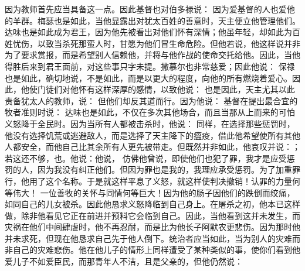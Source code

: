 因为教师首先应当具备这一点。因此基督也对伯多禄说： 因为爱基督的人也爱他的羊群。梅瑟也是如此，当他显露出对犹太百姓的善意时，天主便立他管理他们。达味也是如此成为君王，因为他先被看出对他们怀有深情；他虽年轻，却如此为百姓忧伤，以致当杀死那蛮人时，甘愿为他们冒生命危险。但他若说，他这样说并非为了要求赏报，而是希望别人信赖他，并将与他作战的使命交托给他。因此，当他得胜后来到君王面前，对这些事只字未提。撒慕尔也非常慈爱；因此他说： 保禄也是如此，确切地说，不是如此，而是以更大的程度，向他的所有燃烧着爱心。因此，他使门徒们对他怀有这样深厚的感情，以致他说： 也是因此，天主尤其以此责备犹太人的教师，说： 但他们却反其道而行。因为他说： 基督在提出最合宜的牧者准则时说： 达味也是如此，不仅在多次其他场合，而且当那从上而来的可怕义怒降于全民时。因为当所有人都被击杀时，他说： 同样，在选择那些惩罚时，他没有选择饥荒或逃避敌人，而是选择了天主降下的瘟疫，借此他希望使所有其他人都安全，而他自己比其余所有人更先被带走。但既然并非如此，他哀叹并说：；若这还不够，也。他说：他说， 仿佛他曾说，即使他们也犯了罪，我才是应受惩罚的人，因为我没有纠正他们。但因为罪也是我的，我理应承受惩罚。为了加重罪行，他用了这个名称。于是就这样平息了义怒，就这样使判决撤销！认罪的力量何等伟大！ 一位善牧的关怀与同情何等巨大！因为他的肠子因他们的跌倒而绞痛，如同自己的儿女被杀。因此他恳求义怒降临到自己身上。在屠杀之初，他本已这样做，除非他看见它正在前进并预料它会临到自己。因此，当他看到这并未发生，而灾祸在他们中间肆虐时，他不再忍耐，而是比为他长子阿默农更悲伤。因为那时他并未求死，但现在他恳求自己先于他人倒下。统治者应当如此，当为别人的灾难而非自己的灾难悲伤。他在他儿子的情形上同样遭受了某种类似的事，使你们看到他爱儿子不如爱臣民，而那青年人不洁，且是父亲的，但他仍然说： 